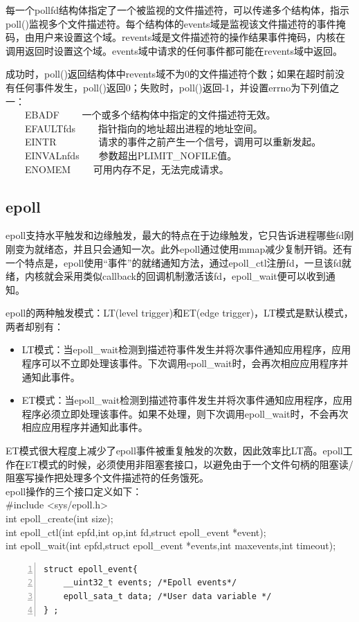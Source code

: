 每一个pollfd结构体指定了一个被监视的文件描述符，可以传递多个结构体，指示poll()监视多个文件描述符。每个结构体的events域是监视该文件描述符的事件掩码，由用户来设置这个域。revents域是文件描述符的操作结果事件掩码，内核在调用返回时设置这个域。events域中请求的任何事件都可能在revents域中返回。

成功时，poll()返回结构体中revents域不为0的文件描述符个数；如果在超时前没有任何事件发生，poll()返回0；失败时，poll()返回-1，并设置errno为下列值之一：\\
　　EBADF　　       一个或多个结构体中指定的文件描述符无效。\\
　　EFAULTfds　　 指针指向的地址超出进程的地址空间。\\
　　EINTR　　　　  请求的事件之前产生一个信号，调用可以重新发起。\\
　　EINVALnfds　　参数超出PLIMIT\_NOFILE值。\\
　　ENOMEM　　     可用内存不足，无法完成请求。\\
\subsection{epoll}
epoll支持水平触发和边缘触发，最大的特点在于边缘触发，它只告诉进程哪些fd刚刚变为就绪态，并且只会通知一次。此外epoll通过使用mmap减少复制开销。还有一个特点是，epoll使用“事件”的就绪通知方法，通过epoll\_ctl注册fd，一旦该fd就绪，内核就会采用类似callback的回调机制激活该fd，epoll\_wait便可以收到通知。

epoll的两种触发模式：LT(level trigger)和ET(edge trigger)，LT模式是默认模式，两者却别有：
\begin{itemize}
\item LT模式：当epoll\_wait检测到描述符事件发生并将次事件通知应用程序，应用程序可以不立即处理该事件。下次调用epoll\_wait时，会再次相应应用程序并通知此事件。
\item ET模式：当epoll\_wait检测到描述符事件发生并将次事件通知应用程序，应用程序必须立即处理该事件。如果不处理，则下次调用epoll\_wait时，不会再次相应应用程序并通知此事件。
\end{itemize}
ET模式很大程度上减少了epoll事件被重复触发的次数，因此效率比LT高。epoll工作在ET模式的时候，必须使用非阻塞套接口，以避免由于一个文件句柄的阻塞读/阻塞写操作把处理多个文件描述符的任务饿死。\\
epoll操作的三个接口定义如下：\\
\#include <sys/epoll.h>\\
int epoll\_create(int size);\\
int epoll\_ctl(int epfd,int op,int fd,struct epoll\_event *event);\\
int epoll\_wait(int epfd,struct epoll\_event *events,int maxevents,int timeout);\\
\begin{lstlisting}[language={[ANSI]C},numbers=left,numberstyle=\tiny,%frame=shadowbox,
   rulesepcolor=\color{red!20!green!20!blue!20},
   keywordstyle=\color{blue!70!black},
   commentstyle=\color{blue!90!},
   basicstyle=\ttfamily]
struct epoll_event{ 
	__uint32_t events; /*Epoll events*/
	epoll_sata_t data; /*User data variable */
} ; 
\end{lstlisting}

